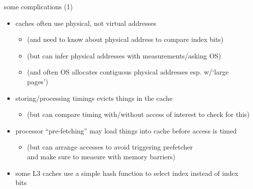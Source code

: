 \begin{frame}{some complications (1)}
    \begin{itemize}
    \item caches often use physical, not virtual addresses
        \begin{itemize}
        \item (and need to know about physical address to compare index bits)
        \item (but can infer physical addresses with measurements/asking OS)
        \item (and often OS allocates contiguous physical addresses esp. w/`large pages')
        \end{itemize}
    \item storing/processing timings evicts things in the cache
        \begin{itemize}
        \item (but can compare timing with/without access of interest to check for this)
        \end{itemize}
    \item processor ``pre-fetching'' may load things into cache before access is timed
        \begin{itemize}
            \item (but can arrange accesses to avoid triggering prefetcher \\
                and make sure to measure with memory barriers)
        \end{itemize}
    \item some L3 caches use a simple hash function to select index instead of  index bits
    \end{itemize}
\end{frame}

